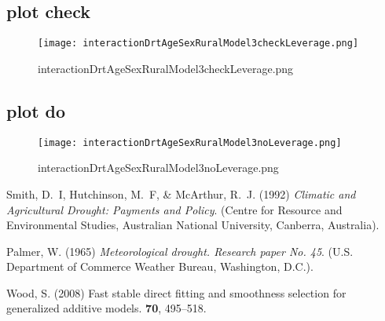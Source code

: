 \documentclass[a4paper]{article}                %
\begin{document}
\subsection{plot check}


        \begin{figure}[!h]
        \centering
        \texttt{[image: interactionDrtAgeSexRuralModel3checkLeverage.png]}
        \caption{interactionDrtAgeSexRuralModel3checkLeverage.png}
        \label{fig:interactionDrtAgeSexRuralModel3checkLeverage.png}
        \end{figure}
        \clearpage



\subsection{plot do}

 \begin{figure}[!h]
        \centering
        \texttt{[image: interactionDrtAgeSexRuralModel3noLeverage.png]}
        \caption{interactionDrtAgeSexRuralModel3noLeverage.png}
        \label{fig:interactionDrtAgeSexRuralModel3noLeverage.png}
        \end{figure}
        \clearpage




        \begin{thebibliography}{1}

        Smith, D.~I, Hutchinson, M.~F,  \& McArthur, R.~J.
        \newblock (1992) {\em {Climatic and Agricultural Drought: Payments and
        Policy}}.
        \newblock (Centre for Resource and Environmental Studies, Australian National
        University, Canberra, Australia).

        Palmer, W.
        \newblock (1965) {\em {Meteorological drought. Research paper No. 45}}.
        \newblock (U.S. Department of Commerce Weather Bureau, Washington, D.C.).

        Wood, S.
        \newblock (2008) {Fast stable direct fitting and smoothness selection for
        generalized additive models}.
         {\bf 70}, 495--518.

        \end{thebibliography}
\end{document}
